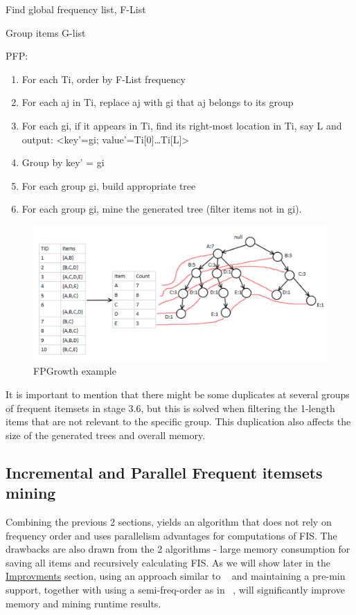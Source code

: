 \begin{steps}
	\item Find global frequency list, F-List
	\item Group items G-list
	\item PFP:
		\begin{enumerate}
			\item For each Ti, order by F-List frequency
			\item For each aj in Ti, replace aj with gi that aj belongs to its group
			\item For each gi, if it appears in Ti, find its right-most location in Ti, say L and output:
 <key'=gi; value'={Ti[0]…Ti[L]}>
 			\item Group by key' = gi
 			\item For each group gi, build appropriate tree
 			\item For each group gi, mine the generated tree (filter items not in gi).
		\end{enumerate}
\end{steps}

\begin{figure}
  \centering
  \includegraphics[width=\linewidth]{figures/fpgrowthexample}
  \caption{FPGrowth example}
  \label{fig:fpgrowthexample}
\end{figure}

It is important to mention that there might be some duplicates at several groups of frequent itemsets in stage 3.6, but this is solved when filtering the 1-length items that are not relevant to the specific group. This duplication also affects the size of the generated trees and overall memory.

\subsection{Incremental and Parallel Frequent itemsets mining}

Combining the previous 2 sections, yields an algorithm that does not rely on frequency order and uses parallelism advantages for computations of FIS.
The drawbacks are also drawn from the 2 algorithms - large memory consumption for saving all items and recursively calculating FIS. As we will show later in the \hyperref[sec:improvements]{Improvments} section, using an approach similar to ~\cite{kohefficient} and maintaining a pre-min support, together with using a semi-freq-order as in ~\cite{tanbeer2009efficient}, will significantly improve memory and mining runtime results.

